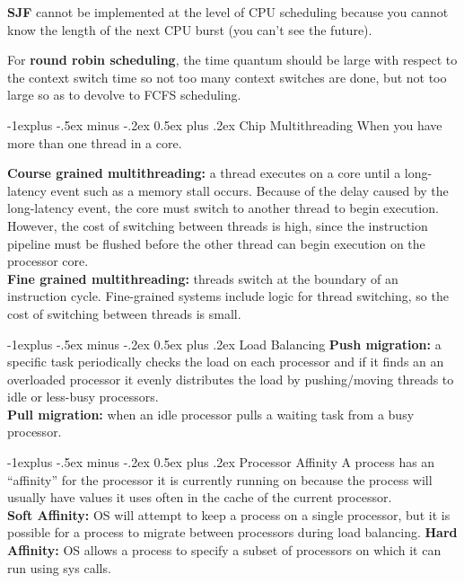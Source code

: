 \documentclass[letterpaper, 8pt]{extarticle}
\makeatletter
\renewcommand{\subsection}{\@startsection{subsection}{2}{0mm}%
                                {-1explus -.5ex minus -.2ex}%
                                {0.5ex plus .2ex}%
                                {\normalfont\small\bfseries}}
\makeatother
\begin{document}
\begin{multicols*}{6}
    \textbf{SJF} cannot be implemented at the level of CPU scheduling because
    you cannot know the length of the next CPU burst (you can't see the future).

    For \textbf{round robin scheduling}, the time quantum should be large
    with respect to the context switch time so not too many context switches
    are done, but not too large so as to devolve to FCFS scheduling.

    \subsection{Chip Multithreading}
    When you have more than one thread in a core.

    \textbf{Course grained multithreading:} a thread executes on a core until a
    long-latency event such as a memory stall occurs. Because of the delay
    caused by the long-latency event, the core must switch to another thread to
    begin execution. However, the cost of switching between threads is high,
    since the instruction pipeline must be flushed before the other thread can
    begin execution on the processor core. \\
    \textbf{Fine grained multithreading:} threads switch at the boundary of
    an instruction cycle. Fine-grained systems include logic
    for thread switching, so the cost of switching between threads is small.

    \subsection{Load Balancing}
    \textbf{Push migration:} a specific task periodically checks the
    load on each processor and if it finds an an overloaded processor it
    evenly distributes the load by pushing/moving threads to idle or less-busy
    processors.\\
    \textbf{Pull migration:} when an idle processor pulls a waiting task
    from a busy processor.

    \subsection{Processor Affinity}
    A process has an ``affinity'' for the processor it is currently
    running on because the process will usually have values it uses often
    in the cache of the current processor.\\
    \textbf{Soft Affinity:} OS will attempt to keep a process on a single
    processor, but it is possible for a process to migrate
    between processors during load balancing.
    \textbf{Hard Affinity:} OS allows a process to specify a subset of
    processors on which it can run using sys calls.


\end{multicols*}
\end{document}
